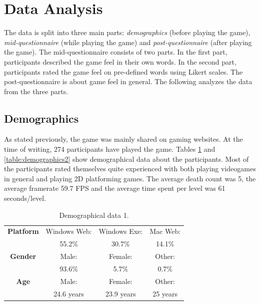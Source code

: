 \section{Data Analysis} \label{data}
The data is split into three main parts: \textit{demographics} (before playing the game), \textit{mid-questionnaire} (while playing the game) and \textit{post-questionnaire} (after playing the game). The mid-questionnaire consists of two parts. In the first part, participants described the game feel in their own words. In the second part, participants rated the game feel on pre-defined words using Likert scales. The post-questionnaire is about game feel in general. The following analyzes the data from the three parts.

\subsection{Demographics}
As stated previously, the game was mainly shared on gaming websites. At the time of writing, 274 participants have played the game. Tables \ref{table:demographics1} and \ref{table:demographics2} show demographical data about the participants. Most of the participants rated themselves quite experienced with both playing videogames in general and playing 2D platforming games. The average death count was 5, the average framerate 59.7 FPS and the average time spent per level was 61 seconds/level.

\begin{table} \centering
\small
\caption{Demographical data 1.}
\label{table:demographics1}
\renewcommand{\arraystretch}{1.2}
\begin{tabular}{cccc}
\toprule
\textbf{Platform} & Windows Web: & Windows Exe: & Mac Web: \\
                  & 55.2\%      & 30.7\%      & 14.1\%  \\
\textbf{Gender}   & Male:        & Female:      & Other:   \\
                  & 93.6\%      & 5.7\%       & 0.7\%   \\
\textbf{Age}      & Male:     & Female:            & Other:        \\
                  & 24.6 years  & 23.9 years           & 25 years        \\
\bottomrule
\end{tabular}
\end{table}

